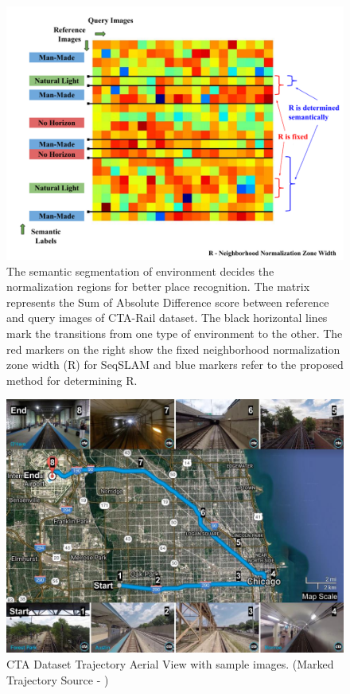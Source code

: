 \documentclass[letterpaper, 10 pt, conference]{ieeeconf}  %
\begin{document}
\begin{figure}
 \includegraphics[scale=0.33]{SADmat-NormalisationMethod}
 \caption{The semantic segmentation of environment decides the normalization regions for better place recognition. The matrix represents the Sum of Absolute Difference score between reference and query images of CTA-Rail dataset. The black horizontal lines mark the transitions from one type of environment to the other. The red markers on the right show the fixed neighborhood normalization zone width (R) for SeqSLAM and blue markers refer to the proposed method for determining R.}
 \label{fig:SADmatRdisplay}
\end{figure}

\begin{figure}[h]
\centering
 \includegraphics[scale=0.23]{cta-datasetTrajSampleImages}
 \caption{CTA Dataset Trajectory Aerial View with sample images. (Marked Trajectory Source - \cite{ctaTrajGMap})}
 \label{fig:ctaTraj}
\end{figure}
\end{document}
